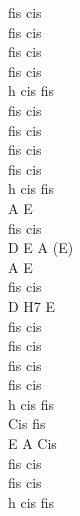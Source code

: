 \documentclass[a5paper, 10pt]{book}
\begin{document}
\begin{minipage}[t]{0.2\textwidth}
  fis cis\\
  fis cis\\
  fis cis\\
  fis cis\\
  h cis fis\\

  fis cis\\
  fis cis\\
  fis cis\\
  fis cis\\
  h cis fis\\

  A E\\
  fis cis\\
  D E A (E)\\

  A E\\
  fis cis\\
  D H7 E\\

  fis cis\\
  fis cis\\
  fis cis\\
  fis cis\\
  h cis fis\\


  Cis fis\\
  E A Cis\\

  fis cis\\
  fis cis\\
  h cis fis\\


\end{minipage}

\newpage
\end{document}
